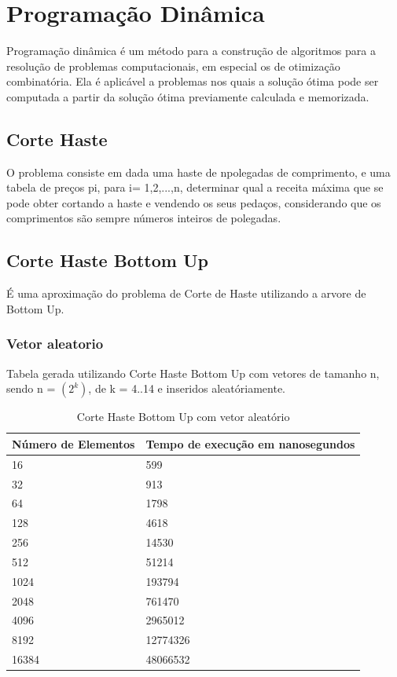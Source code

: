 \documentclass[12pt,a4paper,twoside]{report}
\begin{document}
\chapter{Programação Dinâmica}

Programação dinâmica é um método para a construção de algoritmos para a resolução de problemas computacionais, em especial os de otimização combinatória. Ela é aplicável a problemas nos quais a solução ótima pode ser computada a partir da solução ótima previamente calculada e memorizada.

\section{Corte Haste}

O problema consiste em dada uma haste de npolegadas de comprimento, e uma tabela de preços pi, para i= 1,2,...,n, determinar qual a receita máxima que se pode obter cortando a haste e vendendo os seus pedaços, considerando que os comprimentos são sempre números inteiros de polegadas.


\section{Corte Haste Bottom Up}

É uma aproximação do problema de Corte de Haste utilizando a arvore de Bottom Up.

\subsection{Vetor aleatorio}
Tabela gerada utilizando Corte Haste Bottom Up com vetores de tamanho n, sendo n = $(2^k)$, de k = 4..14 e inseridos aleatóriamente.
\begin{table}[H]
\centering
\caption{Corte Haste Bottom Up com vetor aleatório}
\label{my-label}
\begin{tabular}{|l|l|}
\hline
\multicolumn{1}{|c|}{\textbf{Número de Elementos}} & \multicolumn{1}{c|}{\textbf{Tempo de execução em nanosegundos}} \\ \hline
16 & 599 \\ \hline
32 & 913 \\ \hline
64 & 1798 \\ \hline
128 & 4618 \\ \hline
256 & 14530 \\ \hline
512 & 51214 \\ \hline
1024 & 193794 \\ \hline
2048 & 761470 \\ \hline
4096 & 2965012 \\ \hline
8192 & 12774326 \\ \hline
16384 & 48066532 \\ \hline
\end{tabular}
\end{table}
\end{document}
